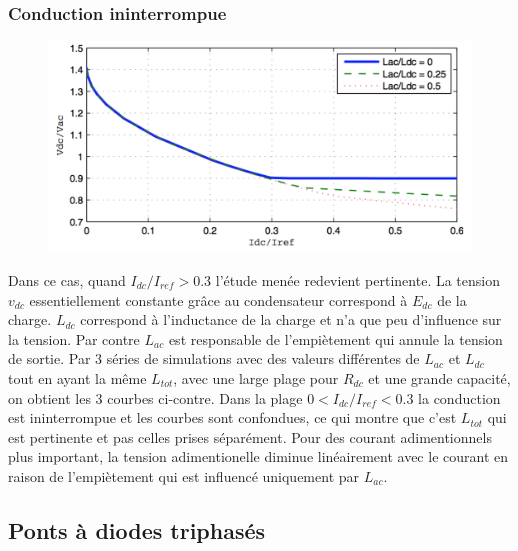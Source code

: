 		\subsubsection{Conduction ininterrompue}
			\begin{figure}
			\vspace{-5mm}
			\includegraphics[scale=0.3]{ch2/17}
			\end{figure} 
			Dans ce cas, quand $I_{dc}/I_{ref}>0.3$ l'étude menée redevient pertinente. La tension $v_{dc}$ essentiellement constante grâce au condensateur correspond à $E_{dc}$ de la charge. $L_{dc}$ correspond à l'inductance de la charge et n'a que peu d'influence sur la tension. Par contre $L_{ac}$ est responsable de l'empiètement qui annule la tension de sortie. Par 3 séries de simulations avec des valeurs différentes de $L_{ac}$ et $L_{dc}$ tout en ayant la même $L_{tot}$, avec une large plage pour $R_{dc}$ et une grande capacité, on obtient les 3 courbes ci-contre. Dans la plage $0<I_{dc}/I_{ref}<0.3$ la conduction est ininterrompue et les courbes sont confondues, ce qui montre que c'est $L_{tot}$ qui est pertinente et pas celles prises séparément. Pour des courant adimentionnels plus important, la tension adimentionelle diminue linéairement avec le courant en raison de l'empiètement qui est influencé uniquement par $L_{ac}$.
			
	\subsection{Ponts à diodes triphasés}
	
